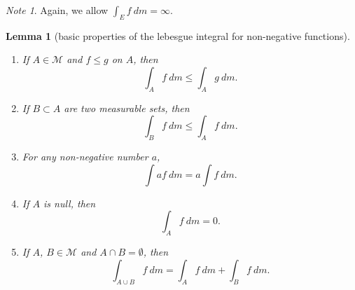 \documentclass[a4paper,12pt]{scrreprt}
\theoremstyle{definition}
\theoremstyle{plain}
\newtheorem{lemma}{Lemma}[section]
\theoremstyle{remark}
\newtheorem{note}{Note}[section]
\begin{document}
\begin{note}
  Again, we allow $\int_{E} f\ dm = \infty$.
\end{note}

\begin{lemma}[basic properties of the lebesgue integral for non-negative functions]
  \label{lemma:basicpropertiesoflebesgueintegralofnonnegativefunction}
  $\,$
  \begin{enumerate}
    \item If $A \in \mathcal{M}$ and $f \leq g$ on $A$, then
      \begin{equation*}
        \int_{A} f\ dm \leq \int_{A} g\ dm.
      \end{equation*}

    \item If $B \subset A$ are two measurable sets, then
      \begin{equation*}
        \int_{B} f\ dm \leq \int_{A} f\ dm.
      \end{equation*}

    \item For any non-negative number $a$,
      \begin{equation*}
        \int af\ dm = a \int f\ dm.
      \end{equation*}

    \item If $A$ is null, then
      \begin{equation*}
        \int_{A} f\ dm = 0.
      \end{equation*}

    \item If $A$, $B \in \mathcal{M}$ and $A \cap B = \emptyset$, then
      \begin{equation*}
        \int_{A \cup B} f\ dm = \int_{A} f\ dm + \int_{B} f\ dm.
      \end{equation*}
  \end{enumerate}
\end{lemma}
\end{document}
